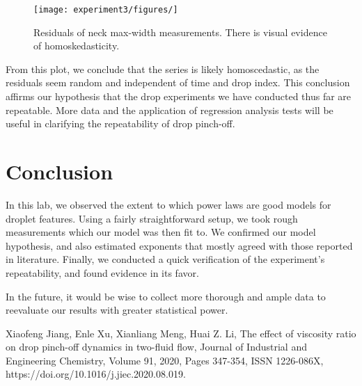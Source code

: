 \documentclass[12pt, letterpaper]{article}
\begin{document}
\begin{figure}[!h]
    \centering
    \texttt{[image: experiment3/figures/]}
    \caption{Residuals of neck max-width measurements. There is visual evidence of homoskedasticity. }
    \label{fig:repeatability1}
\end{figure}

From this plot, we conclude that the series is likely homoscedastic, as the residuals seem random and independent of time and drop index. This conclusion affirms our hypothesis that the drop experiments we have conducted thus far are repeatable. More data and the application of regression analysis tests will be useful in clarifying the repeatability of drop pinch-off. 

\section{Conclusion}

In this lab, we observed the extent to which power laws are good models for droplet features. Using a fairly straightforward setup, we took rough measurements which our model was then fit to. We confirmed our model hypothesis, and also estimated exponents that mostly agreed with those reported in literature. Finally, we conducted a quick verification of the experiment's repeatability, and found evidence in its favor. 

In the future, it would be wise to collect more thorough and ample data to reevaluate our results with greater statistical power. 

\begin{thebibliography}{!h}
    Xiaofeng Jiang, Enle Xu, Xianliang Meng, Huai Z. Li, The effect of viscosity ratio on drop pinch-off dynamics in two-fluid flow, Journal of Industrial and Engineering Chemistry, Volume 91, 2020, Pages 347-354, ISSN 1226-086X, https://doi.org/10.1016/j.jiec.2020.08.019.
\end{thebibliography}
\end{document}

